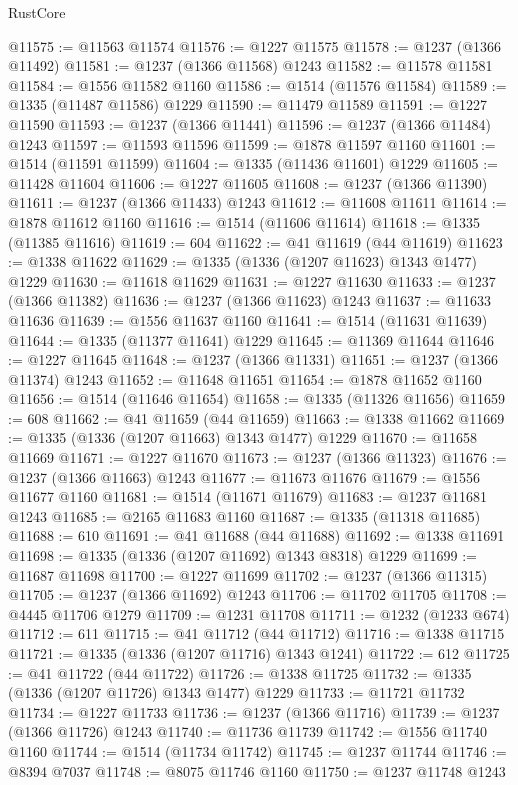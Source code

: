 \begin{lexlean}{RustCore}
\begin{coremodule}
@11575 := @11563 @11574
@11576 := @1227 @11575
@11578 := @1237 (@1366 @11492)
@11581 := @1237 (@1366 @11568) @1243
@11582 := @11578 @11581
@11584 := @1556 @11582 @1160
@11586 := @1514 (@11576 @11584)
@11589 := @1335 (@11487 @11586) @1229
@11590 := @11479 @11589
@11591 := @1227 @11590
@11593 := @1237 (@1366 @11441)
@11596 := @1237 (@1366 @11484) @1243
@11597 := @11593 @11596
@11599 := @1878 @11597 @1160
@11601 := @1514 (@11591 @11599)
@11604 := @1335 (@11436 @11601) @1229
@11605 := @11428 @11604
@11606 := @1227 @11605
@11608 := @1237 (@1366 @11390)
@11611 := @1237 (@1366 @11433) @1243
@11612 := @11608 @11611
@11614 := @1878 @11612 @1160
@11616 := @1514 (@11606 @11614)
@11618 := @1335 (@11385 @11616)
@11619 := 604
@11622 := @41 @11619 (@44 @11619)
@11623 := @1338 @11622
@11629 := @1335 (@1336 (@1207 @11623) @1343 @1477) @1229
@11630 := @11618 @11629
@11631 := @1227 @11630
@11633 := @1237 (@1366 @11382)
@11636 := @1237 (@1366 @11623) @1243
@11637 := @11633 @11636
@11639 := @1556 @11637 @1160
@11641 := @1514 (@11631 @11639)
@11644 := @1335 (@11377 @11641) @1229
@11645 := @11369 @11644
@11646 := @1227 @11645
@11648 := @1237 (@1366 @11331)
@11651 := @1237 (@1366 @11374) @1243
@11652 := @11648 @11651
@11654 := @1878 @11652 @1160
@11656 := @1514 (@11646 @11654)
@11658 := @1335 (@11326 @11656)
@11659 := 608
@11662 := @41 @11659 (@44 @11659)
@11663 := @1338 @11662
@11669 := @1335 (@1336 (@1207 @11663) @1343 @1477) @1229
@11670 := @11658 @11669
@11671 := @1227 @11670
@11673 := @1237 (@1366 @11323)
@11676 := @1237 (@1366 @11663) @1243
@11677 := @11673 @11676
@11679 := @1556 @11677 @1160
@11681 := @1514 (@11671 @11679)
@11683 := @1237 @11681 @1243
@11685 := @2165 @11683 @1160
@11687 := @1335 (@11318 @11685)
@11688 := 610
@11691 := @41 @11688 (@44 @11688)
@11692 := @1338 @11691
@11698 := @1335 (@1336 (@1207 @11692) @1343 @8318) @1229
@11699 := @11687 @11698
@11700 := @1227 @11699
@11702 := @1237 (@1366 @11315)
@11705 := @1237 (@1366 @11692) @1243
@11706 := @11702 @11705
@11708 := @4445 @11706 @1279
@11709 := @1231 @11708
@11711 := @1232 (@1233 @674)
@11712 := 611
@11715 := @41 @11712 (@44 @11712)
@11716 := @1338 @11715
@11721 := @1335 (@1336 (@1207 @11716) @1343 @1241)
@11722 := 612
@11725 := @41 @11722 (@44 @11722)
@11726 := @1338 @11725
@11732 := @1335 (@1336 (@1207 @11726) @1343 @1477) @1229
@11733 := @11721 @11732
@11734 := @1227 @11733
@11736 := @1237 (@1366 @11716)
@11739 := @1237 (@1366 @11726) @1243
@11740 := @11736 @11739
@11742 := @1556 @11740 @1160
@11744 := @1514 (@11734 @11742)
@11745 := @1237 @11744
@11746 := @8394 @7037
@11748 := @8075 @11746 @1160
@11750 := @1237 @11748 @1243

\end{coremodule}
\end{lexlean}
